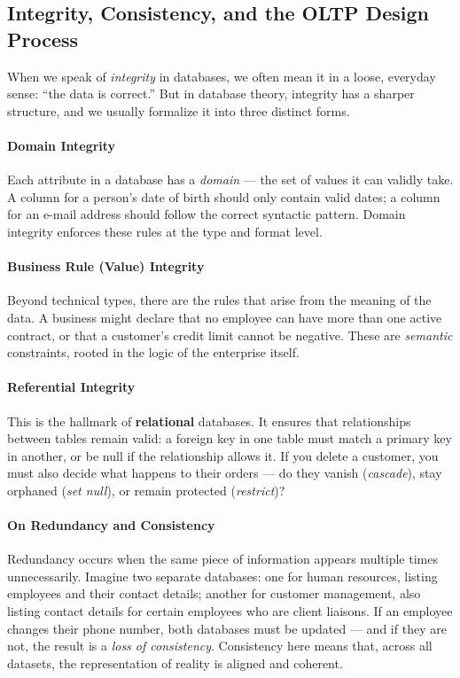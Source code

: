 \documentclass[12pt,a4paper]{article}
\begin{document}
\subsection{Integrity, Consistency, and the OLTP Design Process}

When we speak of \emph{integrity} in databases, we often mean it in a loose, everyday sense:  
``the data is correct.'' But in database theory, integrity has a sharper structure, and we usually formalize it into three distinct forms.

\paragraph{Domain Integrity}  
Each attribute in a database has a \emph{domain} --- the set of values it can validly take.  
A column for a person’s date of birth should only contain valid dates;  
a column for an e-mail address should follow the correct syntactic pattern.  
Domain integrity enforces these rules at the type and format level.

\paragraph{Business Rule (Value) Integrity}  
Beyond technical types, there are the rules that arise from the meaning of the data.  
A business might declare that no employee can have more than one active contract,  
or that a customer’s credit limit cannot be negative.  
These are \emph{semantic} constraints, rooted in the logic of the enterprise itself.

\paragraph{Referential Integrity}  
This is the hallmark of \textbf{relational} databases.  
It ensures that relationships between tables remain valid:  
a foreign key in one table must match a primary key in another,  
or be null if the relationship allows it.  
If you delete a customer, you must also decide what happens to their orders ---  
do they vanish (\emph{cascade}), stay orphaned (\emph{set null}), or remain protected (\emph{restrict})?

\paragraph{On Redundancy and Consistency}  
Redundancy occurs when the same piece of information appears multiple times unnecessarily.  
Imagine two separate databases: one for human resources, listing employees and their contact details;  
another for customer management, also listing contact details for certain employees who are client liaisons.  
If an employee changes their phone number, both databases must be updated ---  
and if they are not, the result is a \emph{loss of consistency}.  
Consistency here means that, across all datasets, the representation of reality is aligned and coherent.
\end{document}
